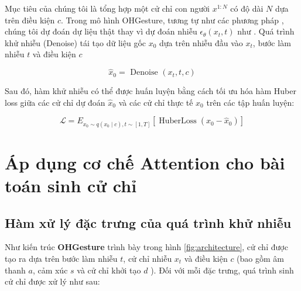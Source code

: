 Mục tiêu của chúng tôi là tổng hợp một cử chỉ con người $x^{1: N}$ có độ dài $N$ dựa trên điều kiện $c$. Trong mô hình OHGesture, tương tự như các phương pháp \cite{ramesh2022hierarchical} \cite{tevet2022human}, chúng tôi dự đoán dự liệu thật thay vì dự đoán nhiễu $\epsilon_{\theta}\left(x_{t}, t\right)$ như \cite{ho2020denoising}. Quá trình khử nhiễu (Denoise) tái tạo dữ liệu gốc $x_{0}$ dựa trên nhiễu đầu vào $x_{t}$, bước làm nhiễu $t$ và điều kiện $c$

\begin{equation} \label{eq:condition}
\hat{x}_{0}=\text { Denoise }\left(x_{t}, t, c\right)
\end{equation}

Sau đó, hàm khử nhiễu có thể được huấn luyện bằng cách tối ưu hóa hàm Huber loss \cite{huber1992robust} giữa các cử chỉ dự đoán $\hat{x}_{0}$ và các cử chỉ thực tế $x_{0}$ trên các tập huấn luyện:

\begin{equation} \label{eq:huberloss}
\mathcal{L}=E_{x_{0} \sim q\left(x_{0} \mid c\right), t \sim[1, T]}\left[\operatorname{HuberLoss}\left(x_{0}-\hat{x}_{0}\right)\right]
\end{equation}



\section{Áp dụng cơ chế Attention cho bài toán sinh cử chỉ}

\subsection{Hàm xử lý đặc trưng của quá trình khử nhiễu}

Như kiến trúc \textbf{OHGesture} trình bày trong hình \autoref{fig:architecture}, cử chỉ được tạo ra dựa trên bước làm nhiễu $t$, cử chỉ nhiễu $x_{t}$ và điều kiện $c$ (bao gồm âm thanh $a$, cảm xúc $s$ và cử chỉ khởi tạo $d$ ). Đối với mỗi đặc trưng, quá trình sinh cử chỉ được xử lý như sau:

